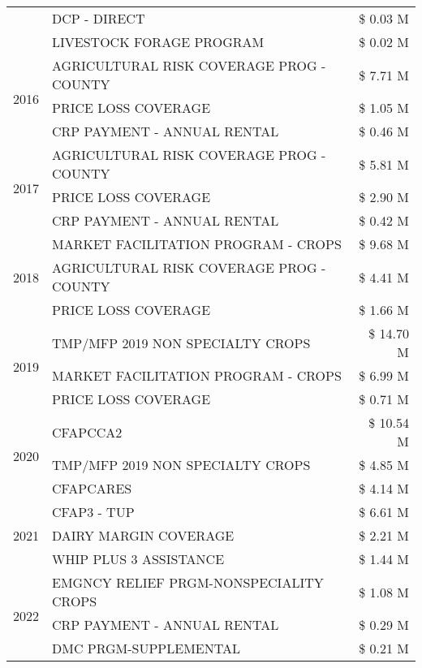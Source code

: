 \begin{tabular}{llr}
 & DCP - DIRECT & \$ 0.03 M \\
 & LIVESTOCK FORAGE PROGRAM & \$ 0.02 M \\
\cline{1-3}
\multirow[t]{3}{*}{2016} & AGRICULTURAL RISK COVERAGE PROG - COUNTY & \$ 7.71 M \\
 & PRICE LOSS COVERAGE & \$ 1.05 M \\
 & CRP PAYMENT - ANNUAL RENTAL & \$ 0.46 M \\
\cline{1-3}
\multirow[t]{3}{*}{2017} & AGRICULTURAL RISK COVERAGE PROG - COUNTY & \$ 5.81 M \\
 & PRICE LOSS COVERAGE & \$ 2.90 M \\
 & CRP PAYMENT - ANNUAL RENTAL & \$ 0.42 M \\
\cline{1-3}
\multirow[t]{3}{*}{2018} & MARKET FACILITATION PROGRAM - CROPS & \$ 9.68 M \\
 & AGRICULTURAL RISK COVERAGE PROG - COUNTY & \$ 4.41 M \\
 & PRICE LOSS COVERAGE & \$ 1.66 M \\
\cline{1-3}
\multirow[t]{3}{*}{2019} & TMP/MFP 2019 NON SPECIALTY CROPS & \$ 14.70 M \\
 & MARKET FACILITATION PROGRAM - CROPS & \$ 6.99 M \\
 & PRICE LOSS COVERAGE & \$ 0.71 M \\
\cline{1-3}
\multirow[t]{3}{*}{2020} & CFAPCCA2 & \$ 10.54 M \\
 & TMP/MFP 2019 NON SPECIALTY CROPS & \$ 4.85 M \\
 & CFAPCARES & \$ 4.14 M \\
\cline{1-3}
\multirow[t]{3}{*}{2021} & CFAP3 - TUP & \$ 6.61 M \\
 & DAIRY MARGIN COVERAGE & \$ 2.21 M \\
 & WHIP PLUS 3 ASSISTANCE & \$ 1.44 M \\
\cline{1-3}
\multirow[t]{3}{*}{2022} & EMGNCY RELIEF PRGM-NONSPECIALITY CROPS & \$ 1.08 M \\
 & CRP PAYMENT - ANNUAL RENTAL & \$ 0.29 M \\
 & DMC PRGM-SUPPLEMENTAL & \$ 0.21 M \\
\cline{1-3}
\bottomrule
\end{tabular}
